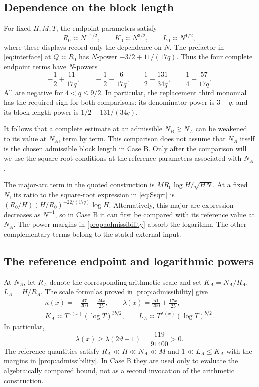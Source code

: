 \documentclass[11pt,reqno]{amsart}
\numberwithin{equation}{section}
\theoremstyle{definition}
\theoremstyle{remark}
\newcommand{\vth}{\vartheta}
\newcommand{\blocklog}{b}
\begin{document}
\subsection{Dependence on the block length}
For fixed $H,M,T$, the endpoint parameters satisfy
\[
 R_0\asymp N^{-1/2},\qquad K_0\asymp N^{3/2},\qquad L_0\asymp N^{1/2},
\]
where these displays record only the dependence on $N$.
The prefactor in \eqref{eq:interface} at $Q\asymp R_0$ has $N$-power $-3/2+11/(17q)$.
Thus the four complete endpoint terms have $N$-powers
\begin{equation}\label{eq:Npowers}
 -\frac12+\frac{11}{17q},\qquad
 -\frac12-\frac6{17q},\qquad
 \frac12-\frac{131}{34q},\qquad
 \frac14-\frac{57}{17q}.
\end{equation}
All are negative for $4<q\le9/2$.
In particular, the replacement third monomial has the required sign for both comparisons: its denominator power is $3-q$, and its block-length power is $1/2-131/(34q)$.

It follows that a complete estimate at an admissible $N_B\gtrsim N_A$ can be weakened to its value at $N_A$, term by term.
This comparison does not assume that $N_A$ itself is the chosen admissible block length in Case B.
Only after the comparison will we use the square-root conditions at the reference parameters associated with $N_A$.


The major-arc term in the quoted construction is $MR_0\log H/\sqrt{HN}$. At a fixed $N$, its ratio to the square-root expression in \eqref{eq:Ssqrt} is
$(R_0/H)(H/R_0)^{-22/(17q)}\log H$.
Alternatively, this major-arc expression decreases as $N^{-1}$, so in Case B it can first be compared with its reference value at $N_A$. The power margins in \cref{prop:admissibility} absorb the logarithm. The other complementary terms belong to the stated external input.

\subsection{The reference endpoint and logarithmic powers}
At $N_A$, let $R_A$ denote the corresponding arithmetic scale and set $K_A=N_A/R_A$, $L_A=H/R_A$.
The scale formulas proved in \cref{prop:admissibility} give
\begin{gather}
 \kappa(x)=-\frac{47}{200}-\frac{24x}{25},\qquad
 \lambda(x)=\frac{51}{200}+\frac{17x}{25},
 \label{eq:kappalambda}\\
 K_A\asymp T^{\kappa(x)}(\log T)^{3\blocklog/2},\qquad
 L_A\asymp T^{\lambda(x)}(\log T)^{\blocklog/2}.
 \label{eq:referenceKL}
\end{gather}
In particular,
\begin{equation}\label{eq:lambdamin}
 \lambda(x)\ge\lambda(2\vth-1)=\frac{119}{91400}>0.
\end{equation}
The reference quantities satisfy $R_A\ll H\ll N_A\ll M$ and $1\ll L_A\le K_A$ with the margins in \cref{prop:admissibility}.
In Case B they are used only to evaluate the algebraically compared bound, not as a second invocation of the arithmetic construction.
\end{document}
